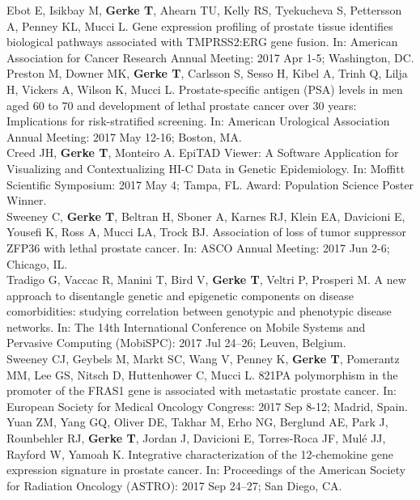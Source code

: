 \documentclass[11pt, a4paper]{article} %
\begin{document}
Ebot E, Isikbay M, {\bf Gerke T}, Ahearn TU, Kelly RS, Tyekucheva S, Pettersson A, Penney KL, Mucci L. Gene expression profiling of prostate tissue identifies biological pathways associated with TMPRSS2:ERG gene fusion. In: American Association for Cancer Research Annual Meeting: 2017 Apr 1-5; Washington, DC.\\

Preston M, Downer MK, {\bf Gerke T}, Carlsson S, Sesso H, Kibel A, Trinh Q, Lilja H, Vickers A, Wilson K, Mucci L. Prostate-specific antigen (PSA) levels in men aged 60 to 70 and development of lethal prostate cancer over 30 years: Implications for risk-stratified screening. In: American Urological Association Annual Meeting: 2017 May 12-16; Boston, MA.\\

Creed JH, {\bf Gerke T}, Monteiro A. EpiTAD Viewer: A Software Application for Visualizing and Contextualizing HI-C Data in Genetic Epidemiology. In: Moffitt Scientific Symposium: 2017 May 4; Tampa, FL. Award: Population Science Poster Winner.\\

Sweeney C, {\bf Gerke T}, Beltran H, Sboner A, Karnes RJ, Klein EA, Davicioni E, Yousefi K, Ross A, Mucci LA, Trock BJ. Association of loss of tumor suppressor ZFP36 with lethal prostate cancer. In: ASCO Annual Meeting: 2017 Jun 2-6; Chicago, IL.\\

Tradigo G, Vaccac R, Manini T, Bird V, {\bf Gerke T}, Veltri P, Prosperi M. A new approach to disentangle genetic and epigenetic components on disease comorbidities: studying correlation between genotypic and phenotypic disease networks. In: The 14th International Conference on Mobile Systems and Pervasive Computing (MobiSPC): 2017 Jul 24--26; Leuven, Belgium.\\

Sweeney CJ, Geybels M, Markt SC, Wang V, Penney K, {\bf Gerke T}, Pomerantz MM, Lee GS, Nitsch D, Huttenhower C, Mucci L. 821PA polymorphism in the promoter of the FRAS1 gene is associated with metastatic prostate cancer. In: European Society for Medical Oncology Congress: 2017 Sep 8-12; Madrid, Spain.\\

Yuan ZM, Yang GQ, Oliver DE, Takhar M, Erho NG, Berglund AE, Park J, Rounbehler RJ, {\bf Gerke T}, Jordan J, Davicioni E, Torres-Roca JF, Mul\'{e} JJ, Rayford W, Yamoah K. Integrative characterization of the 12-chemokine gene expression signature in prostate cancer. In: Proceedings of the American Society for Radiation Oncology (ASTRO): 2017 Sep 24--27; San Diego, CA.\\
\end{document}
